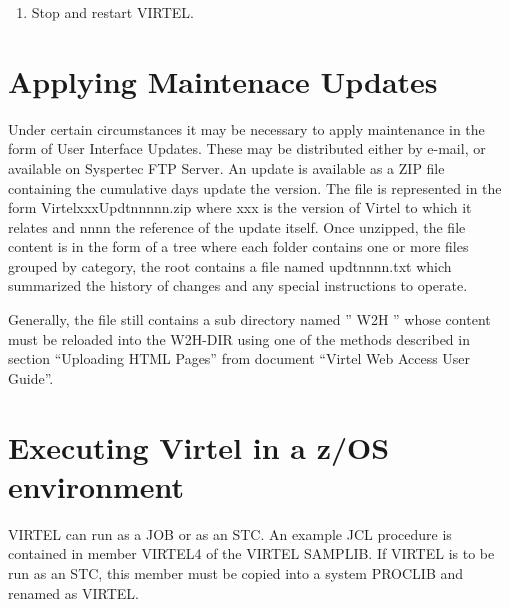 \documentclass[letterpaper,10pt,english]{sphinxmanual}
\begin{document}
\begin{enumerate}
\item {} 
Stop and restart VIRTEL.

\end{enumerate}


\section{Applying Maintenace Updates}
\label{\detokenize{Installation_Guide:applying-maintenace-updates}}\label{\detokenize{Installation_Guide:index-7}}
Under certain circumstances it may be necessary to apply maintenance in the form of User Interface Updates. These may be distributed either by e-mail, or available on Syspertec FTP Server.
An update is available as a ZIP file containing the cumulative days update the version. The file is represented in the form VirtelxxxUpdtnnnnn.zip where xxx is the version of Virtel to which it relates and nnnn the reference of the update itself. Once unzipped, the file content is in the form of a tree where each folder contains one or more files grouped by category, the root contains a file named updtnnnn.txt which summarized the history of changes and any special instructions to operate.

Generally, the file still contains a sub directory named ” W2H ” whose content must be reloaded into the W2H-DIR using one of the methods described in section “Uploading HTML Pages” from document “Virtel Web Access User Guide”.


\section{Executing Virtel in a z/OS environment}
\label{\detokenize{Installation_Guide:index-8}}\label{\detokenize{Installation_Guide:executing-virtel-in-a-z-os-environment}}
VIRTEL can run as a JOB or as an STC. An example JCL procedure is contained in member VIRTEL4 of the VIRTEL SAMPLIB. If VIRTEL is to be run as an STC, this member must be copied into a system PROCLIB and renamed as VIRTEL.
\end{document}
